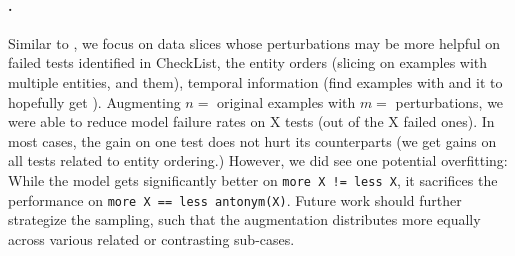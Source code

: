 \paragraph{\qqp.}
Similar to \nli, we focus on data slices whose perturbations may be more helpful on failed tests identified in CheckList, \eg the entity orders (slicing on examples with multiple entities, and  them), temporal information (\eg find examples with  and \BLANK it to hopefully get ).
Augmenting $n=$ original examples with $m=$ perturbations, we were able to reduce model failure rates on X tests (out of the X failed ones). 
In most cases, the gain on one test does not hurt its counterparts (\eg we get gains on all tests related to entity ordering.)
However, we did see one potential overfitting: While the model gets significantly better on  \texttt{more X != less X}, it sacrifices the performance on \texttt{more X == less antonym(X)}.
Future work should further strategize the sampling, such that the augmentation distributes more equally across various related or contrasting sub-cases. 


